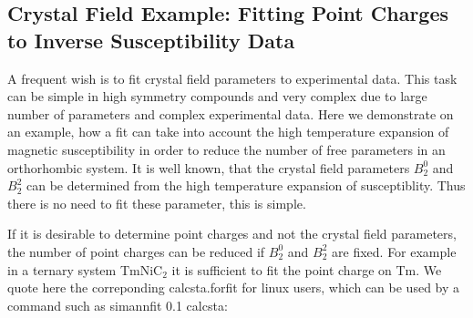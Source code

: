 \subsection{Crystal Field  Example: Fitting Point Charges to Inverse Susceptibility Data}

A frequent wish is to fit crystal field parameters to experimental data. This task can
be simple in high symmetry compounds and  very complex due to large number of parameters
and complex experimental data. Here we demonstrate on an example, how a fit can take into account
the high temperature expansion of magnetic susceptibility in order to reduce the
number of free parameters in an orthorhombic system. It is well known, that the 
crystal field parameters $B_2^0$ and $B_2^2$ can be determined from the high
 temperature expansion of susceptiblity. Thus there is no need to fit these parameter, this
is simple. 

If it is desirable to determine point charges and not the crystal field parameters, the
number of point charges can be reduced if $B_2^0$ and $B_2^2$ are fixed. For example
in a ternary system TmNiC$_2$ it is sufficient to fit the point charge on Tm. We quote here
the correponding {\prg calcsta.forfit}  for linux users, which can be used by a command
such as {\prg simannfit 0.1 calcsta}:

